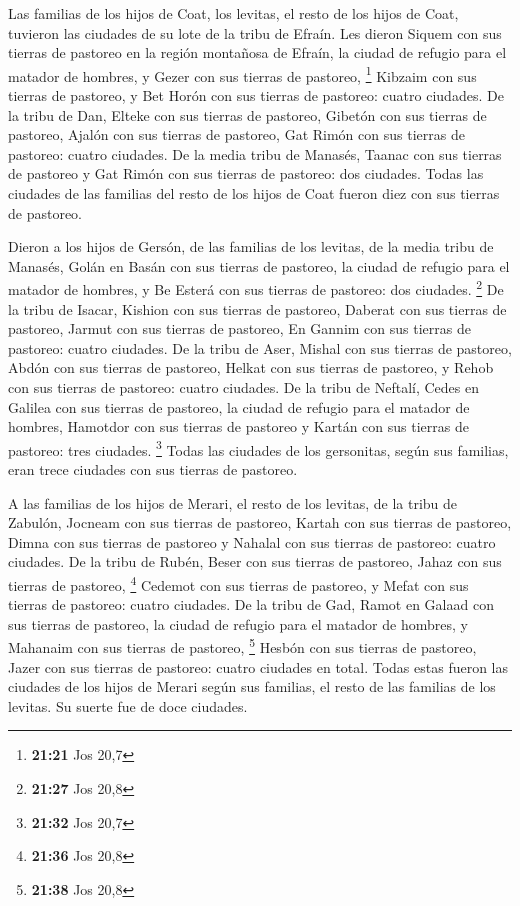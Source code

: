 \begin{paracol}{2}
 Las familias de los hijos de Coat, los levitas, el resto
de los hijos de Coat, tuvieron las ciudades de su lote de la tribu de
Efraín.  Les dieron Siquem con sus tierras de pastoreo en
la región montañosa de Efraín, la ciudad de refugio para el matador de
hombres, y Gezer con sus tierras de pastoreo, \footnote{\textbf{21:21}
  Jos 20,7}  Kibzaim con sus tierras de pastoreo, y Bet
Horón con sus tierras de pastoreo: cuatro ciudades.  De
la tribu de Dan, Elteke con sus tierras de pastoreo, Gibetón con sus
tierras de pastoreo,  Ajalón con sus tierras de pastoreo,
Gat Rimón con sus tierras de pastoreo: cuatro ciudades. 
De la media tribu de Manasés, Taanac con sus tierras de pastoreo y Gat
Rimón con sus tierras de pastoreo: dos ciudades.  Todas
las ciudades de las familias del resto de los hijos de Coat fueron diez
con sus tierras de pastoreo.

 Dieron a los hijos de Gersón, de las familias de los
levitas, de la media tribu de Manasés, Golán en Basán con sus tierras de
pastoreo, la ciudad de refugio para el matador de hombres, y Be Esterá
con sus tierras de pastoreo: dos ciudades. \footnote{\textbf{21:27} Jos
  20,8}  De la tribu de Isacar, Kishion con sus tierras
de pastoreo, Daberat con sus tierras de pastoreo,  Jarmut
con sus tierras de pastoreo, En Gannim con sus tierras de pastoreo:
cuatro ciudades.  De la tribu de Aser, Mishal con sus
tierras de pastoreo, Abdón con sus tierras de pastoreo, 
Helkat con sus tierras de pastoreo, y Rehob con sus tierras de pastoreo:
cuatro ciudades.  De la tribu de Neftalí, Cedes en
Galilea con sus tierras de pastoreo, la ciudad de refugio para el
matador de hombres, Hamotdor con sus tierras de pastoreo y Kartán con
sus tierras de pastoreo: tres ciudades. \footnote{\textbf{21:32} Jos
  20,7}  Todas las ciudades de los gersonitas, según sus
familias, eran trece ciudades con sus tierras de pastoreo.

 A las familias de los hijos de Merari, el resto de los
levitas, de la tribu de Zabulón, Jocneam con sus tierras de pastoreo,
Kartah con sus tierras de pastoreo,  Dimna con sus
tierras de pastoreo y Nahalal con sus tierras de pastoreo: cuatro
ciudades.  De la tribu de Rubén, Beser con sus tierras de
pastoreo, Jahaz con sus tierras de pastoreo, \footnote{\textbf{21:36}
  Jos 20,8}  Cedemot con sus tierras de pastoreo, y Mefat
con sus tierras de pastoreo: cuatro ciudades.  De la
tribu de Gad, Ramot en Galaad con sus tierras de pastoreo, la ciudad de
refugio para el matador de hombres, y Mahanaim con sus tierras de
pastoreo, \footnote{\textbf{21:38} Jos 20,8}  Hesbón con
sus tierras de pastoreo, Jazer con sus tierras de pastoreo: cuatro
ciudades en total.  Todas estas fueron las ciudades de
los hijos de Merari según sus familias, el resto de las familias de los
levitas. Su suerte fue de doce ciudades.


\end{paracol}

